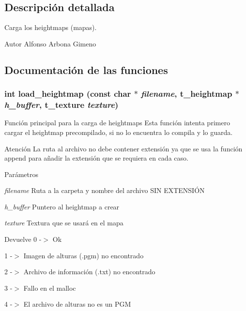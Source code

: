 \subsection{Descripción detallada}
Carga los heightmaps (mapas). \begin{DoxyAuthor}{Autor}
Alfonso Arbona Gimeno 
\end{DoxyAuthor}


\subsection{Documentación de las funciones}
\subsubsection[{load\_\-heightmap}]{\setlength{\rightskip}{0pt plus 5cm}int load\_\-heightmap (const char $\ast$ {\em filename}, \/  {\bf t\_\-heightmap} $\ast$ {\em h\_\-buffer}, \/  {\bf t\_\-texture} {\em texture})}\label{heightmap_8c_a2d71672188b29fc583865d61ff526d86}


Función principal para la carga de heightmaps Esta función intenta primero cargar el heightmap precompilado, si no lo encuentra lo compila y lo guarda. \begin{DoxyWarning}{Atención}
La ruta al archivo no debe contener extensión ya que se usa la función append para añadir la extensión que se requiera en cada caso. 
\end{DoxyWarning}

\begin{DoxyParams}{Parámetros}
\item[{\em filename}]Ruta a la carpeta y nombre del archivo SIN EXTENSIÓN \item[{\em h\_\-buffer}]Puntero al heightmap a crear \item[{\em texture}]Textura que se usará en el mapa \end{DoxyParams}
\begin{DoxyReturn}{Devuelve}
0 -\/$>$ Ok 

1 -\/$>$ Imagen de alturas (.pgm) no encontrado 

2 -\/$>$ Archivo de información (.txt) no encontrado 

3 -\/$>$ Fallo en el malloc 

4 -\/$>$ El archivo de alturas no es un PGM 
\end{DoxyReturn}
